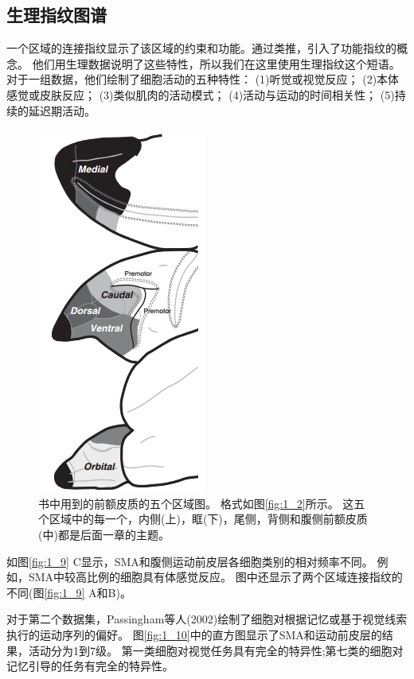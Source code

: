 \subsection{生理指纹图谱}
一个区域的连接指纹显示了该区域的约束和功能。通过类推，引入了功能指纹的概念\cite{2002Dorsal}。
他们用生理数据说明了这些特性，所以我们在这里使用生理指纹这个短语。
对于一组数据，他们绘制了细胞活动的五种特性： 
(1)听觉或视觉反应；
(2)本体感觉或皮肤反应；
(3)类似肌肉的活动模式；
(4)活动与运动的时间相关性；
(5)持续的延迟期活动。

\begin{figure}[!htb]
	\centering
	\includegraphics[width=0.5\linewidth]{image_pfc/Fig_1_8}
	\caption{书中用到的前额皮质的五个区域图。
		格式如图\ref{fig:1_2}所示。
		这五个区域中的每一个，内侧(上)，眶(下)，尾侧，背侧和腹侧前额皮质(中)都是后面一章的主题。\label{fig:1_8}}
\end{figure}

\par
如图\ref{fig:1_9} C显示，SMA和腹侧运动前皮层各细胞类别的相对频率不同。
例如，SMA中较高比例的细胞具有体感觉反应。
图中还显示了两个区域连接指纹的不同(图\ref{fig:1_9} A和B)。
\par
对于第二个数据集，Passingham等人(2002)绘制了细胞对根据记忆或基于视觉线索执行的运动序列的偏好\cite{2002Dorsal,mushiake1991neuronal}。
图\ref{fig:1_10}中的直方图显示了SMA和运动前皮层的结果，活动分为1到7级。
第一类细胞对视觉任务具有完全的特异性;第七类的细胞对记忆引导的任务有完全的特异性。

